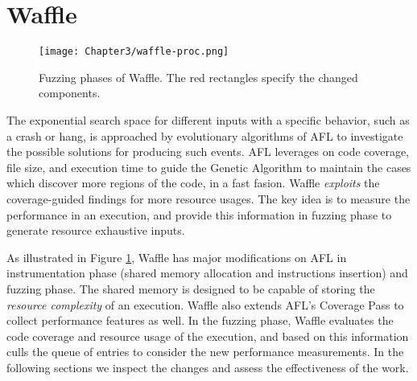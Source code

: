 \section{Waffle}
\label{sec:3-instr}



\begin{figure}[!t]
  \texttt{[image: Chapter3/waffle-proc.png]}
  \centering
  \caption{Fuzzing phases of Waffle. The red rectangles specify the changed components.}
  \label{fig:waffle-phases}
\end{figure}

The exponential search space for different inputs with a specific behavior, such as a crash or hang, is approached by evolutionary algorithms of AFL to investigate the possible solutions for producing such events. AFL leverages on code coverage, file size, and execution time to guide the Genetic Algorithm to maintain the cases which discover more regions of the code, in a fast fasion. Waffle \textit{exploits} the coverage-guided findings for more resource usages. The key idea is to measure the performance in an execution, and provide this information in fuzzing phase to generate resource exhaustive inputs. 


As illustrated in Figure \ref{fig:waffle-phases}, Waffle has major modifications on AFL in instrumentation phase (shared memory allocation and instructions insertion) and fuzzing phase. The shared memory is designed to be capable of storing the \textit{resource complexity} of an execution. Waffle also extends AFL's Coverage Pass to collect performance features as well. In the fuzzing phase, Waffle evaluates the code coverage and resource usage of the execution, and based on this information culls the queue of entries to consider the new performance measurements. In the following sections we inspect the changes and assess the effectiveness of the work.

